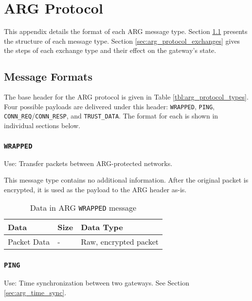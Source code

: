 \chapter{\ac{ARG} Protocol}
\label{chp:protocol}
\par This appendix details the format of each \ac{ARG} message type. Section \ref{sec:arg_protocol_formats} presents the structure of each message type. Section \ref{sec:arg_protocol_exchanges} gives the steps of each exchange type and their effect on the gateway's state.

\section{Message Formats}
\label{sec:arg_protocol_formats}
\par The base header for the \ac{ARG} protocol is given in Table \ref{tbl:arg_protocol_types}. Four possible payloads are delivered under this header: \texttt{WRAPPED}, \texttt{PING}, \texttt{CONN\_REQ}/\texttt{CONN\_RESP}, and \texttt{TRUST\_DATA}. The format for each is shown in individual sections below.

\subsection{\texttt{WRAPPED}}
\par Use: Transfer packets between \ac{ARG}-protected networks.

\par This message type contains no additional information. After the original packet is encrypted, it is used as the payload to the \ac{ARG} header as-is.

\begin{table}[H]
\caption{Data in \ac{ARG} \texttt{WRAPPED} message}
\label{tbl:arg_wrapped_struct}
\centering
\begin{tabular}{l|l|l}
\textbf{Data} & \textbf{Size} & \textbf{Data Type}\\
\hline
Packet Data & - & Raw, encrypted packet
\end{tabular}
\end{table}

\subsection{\texttt{PING}}
\par Use: Time synchronization between two gateways. See Section \ref{sec:arg_time_sync}.

